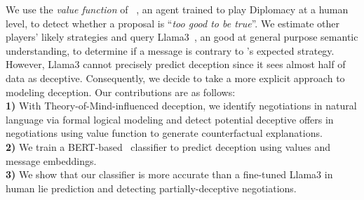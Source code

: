 We use the \emph{value function} of \cicero~\citep{bakhtin2023mastering}, an agent trained to play Diplomacy at a human level, to detect whether a proposal is ``\textit{too good to be true}''. We estimate other players' likely strategies and query Llama3~\cite{llama3modelcard}, an  good at general purpose semantic understanding, to determine if a message is contrary to \cicero{}'s expected strategy. However, Llama3 cannot precisely predict deception since it sees almost half of data as deceptive. Consequently, we decide to take a more explicit approach to modeling deception. Our contributions are as follows:\\
\noindent \textbf{1)} With Theory-of-Mind-influenced deception, we identify negotiations in natural language via formal logical modeling and detect potential deceptive offers in negotiations using \cicero {} value function to generate counterfactual explanations.\\
\noindent \textbf{2)} We train a BERT-based~\cite{devlin-etal-2019-bert} classifier to predict deception using  values and message embeddings.\\
\noindent \textbf{3)} We show that our classifier is more accurate than a fine-tuned Llama3 in human lie prediction and detecting partially-deceptive negotiations. 
